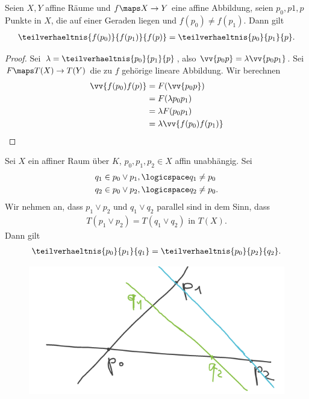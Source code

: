 \begin{lemma}\label{teilverhaeltnis_invariant_unter_affinen_abbildungen}
    Seien \( X,Y \) affine Räume und \( f\maps X\to Y \) eine affine Abbildung, seien \( p_0,p1,p \) Punkte in \( X \), die auf einer Geraden liegen und \( f(p_0)\neq f(p_1) \). Dann gilt
    \begin{align*}
        \teilverhaeltnis{f(p_0)}{f(p_1)}{f(p)}=\teilverhaeltnis{p_0}{p_1}{p}.
    \end{align*}
\end{lemma}
\begin{proof}
    Sei \( \lambda=\teilverhaeltnis{p_0}{p_1}{p} \), also \( \vv{p_0 p}=\lambda\vv{p_0 p_1} \). Sei \( F\maps T(X)\to T(Y) \) die zu \( f \) gehörige lineare Abbildung. Wir berechnen
    \begin{align*}
        \vv{f(p_0) f(p)}\begin{aligned}[t]
            &=F(\vv{p_0 p})\\
            &=F(\lambda{p_0 p_1})\\
            &=\lambda F({p_0 p_1})\\
            &=\lambda \vv{f(p_0) f(p_1)}
        \end{aligned}
    \end{align*}
    
\end{proof}
\begin{anwendung*}[Strahlensatz]
    Sei \( X \) ein affiner Raum über \( K \), \( p_0,p_1,p_2\in X \) affin unabhängig. Sei
    \begin{align*}
        q_1&\in p_0\vee p_1,\logicspace q_1\neq p_0\\
        q_2&\in p_0\vee p_2,\logicspace q_2\neq p_0.
    \end{align*}
    Wir nehmen an, dass \( p_1\vee p_2 \) und \( q_1\vee q_2 \) parallel sind in dem Sinn, dass
    \begin{align*}
        T(p_1\vee p_2)=T(q_1\vee q_2)\text{ in }T(X).
    \end{align*}
    Dann gilt
    \begin{align*}
        \teilverhaeltnis{p_0}{p_1}{q_1}=\teilverhaeltnis{p_0}{p_2}{q_2}.
    \end{align*}
    \begin{figure}[H]
        \centering
        \includegraphics[width=0.5\linewidth]{figures/Strahlensatz}
        \label{fig:Strahlensatz}
    \end{figure}
\end{anwendung*}
